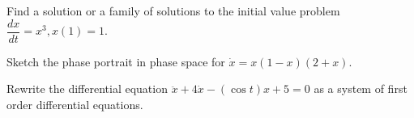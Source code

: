 \documentclass[12pt,letterpaper,noanswers]{exam}
\begin{document}
 \pdfpageheight 11in 
  \pdfpagewidth 8.5in



\begin{questions}
\question Find a solution or a family of solutions to the initial value problem $\dfrac{dx}{dt} = x^3, x(1) = 1$.
\vfill

\question Sketch the phase portrait in phase space for $\dot x = x(1-x)(2+x)$. 


\vfill

\question Rewrite the differential equation $\ddot x + 4\dot x - (\cos t) x + 5 = 0$ as a system of first order differential equations. 

\vfill

\end{questions}
\end{document}
